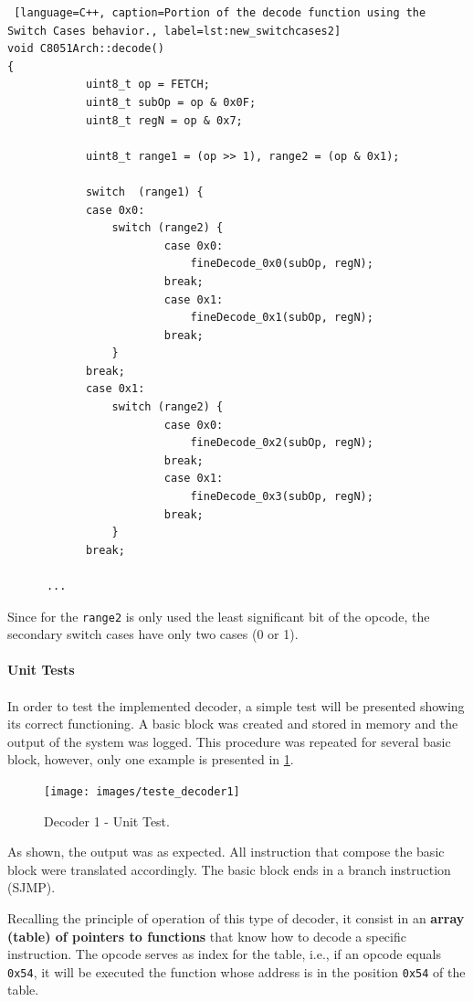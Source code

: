 \begin{lstlisting} [language=C++, caption=Portion of the decode function using the Switch Cases behavior., label=lst:new_switchcases2]
void C8051Arch::decode()
{
			uint8_t op = FETCH;
			uint8_t subOp = op & 0x0F;
			uint8_t regN = op & 0x7;
	
			uint8_t range1 = (op >> 1), range2 = (op & 0x1);

			switch  (range1) {
			case 0x0:
	  			switch (range2) {
	  					case 0x0:
	    					fineDecode_0x0(subOp, regN);
	    				break;
	  					case 0x1:
	    					fineDecode_0x1(subOp, regN);
	   					break;
	  			}
			break;
			case 0x1:
	  			switch (range2) {
	  					case 0x0:
	    					fineDecode_0x2(subOp, regN);
	    				break;
	  					case 0x1:
	    					fineDecode_0x3(subOp, regN);
	    				break;
	  			}
			break;
            
	  ...
\end{lstlisting}

Since for the \texttt{range2} is only used the least significant bit of the opcode, the secondary switch cases have only two cases (0 or 1).	 

\paragraph{Unit Tests}

\paragraph{}

In order to test the implemented decoder, a simple test will be presented showing its correct functioning. A basic block was created and stored in memory and the output of the system was logged. This procedure was repeated for several basic block, however, only one example is presented in \ref{fig:teste1_decoder}.   


\begin{figure}[H]
\centerline{
\texttt{[image: images/teste\_decoder1]}
}
\caption{Decoder 1 - Unit Test.}
\label{fig:teste1_decoder} 
\end{figure}

As shown, the output was as expected. All instruction that compose the basic block were translated accordingly. The basic block ends in a branch instruction (SJMP).


Recalling the principle of operation of this type of decoder, it consist in an \textbf{array (table) of pointers to functions} that know how to decode a specific instruction. The opcode serves as index for the table, i.e., if an opcode equals \texttt{0x54}, it will be executed the function whose address is in the position \texttt{0x54} of the table. 


